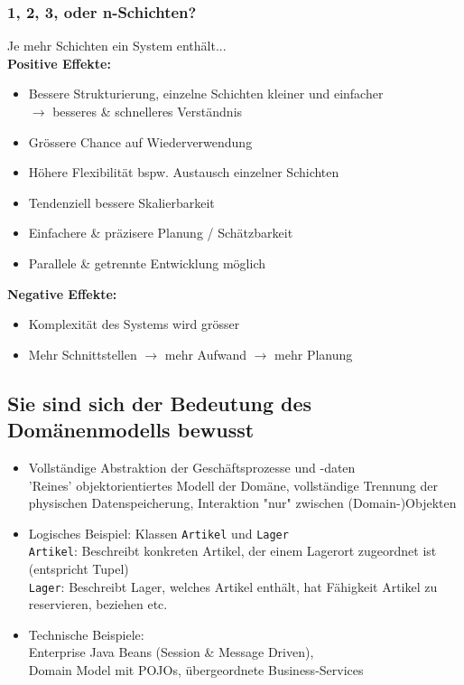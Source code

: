 \documentclass[a4paper]{article}
\begin{document}
			\newpage
			
			\subsubsection{1, 2, 3, oder n-Schichten?}
			
			Je mehr Schichten ein System enthält...\\
			\textbf{Positive Effekte:}
			\begin{itemize}
				\item Bessere Strukturierung, einzelne Schichten kleiner und einfacher\\
				$\rightarrow$ besseres \& schnelleres Verständnis
				\item Grössere Chance auf Wiederverwendung
				\item Höhere Flexibilität bspw. Austausch einzelner Schichten
				\item Tendenziell bessere Skalierbarkeit
				\item Einfachere \& präzisere Planung / Schätzbarkeit
				\item Parallele \& getrennte Entwicklung möglich
			\end{itemize}
			\textbf{Negative Effekte:}
			\begin{itemize}
				\item Komplexität des Systems wird grösser
				\item Mehr Schnittstellen $\rightarrow$ mehr Aufwand $\rightarrow$ mehr Planung
			\end{itemize}
			
			
		\subsection{Sie sind sich der Bedeutung des Domänenmodells bewusst}

			\begin{itemize}
				\item Vollständige Abstraktion der Geschäftsprozesse und -daten\\
				'Reines' objektorientiertes Modell der Domäne, vollständige Trennung der physischen Datenspeicherung, Interaktion "nur" zwischen (Domain-)Objekten
				
				\item Logisches Beispiel: Klassen \texttt{Artikel} und \texttt{Lager}\\
				\texttt{Artikel}: Beschreibt konkreten Artikel, der einem Lagerort zugeordnet ist (entspricht Tupel)\\
				\texttt{Lager}: Beschreibt Lager, welches Artikel enthält, hat Fähigkeit Artikel zu reservieren, beziehen etc.
				
				\item Technische Beispiele:\\
				Enterprise Java Beans (Session \& Message Driven), \\
				Domain Model mit POJOs, übergeordnete Business-Services
			\end{itemize}
		
\end{document}
